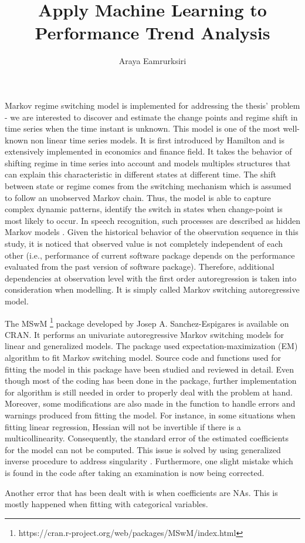 \documentclass[]{article}
\title{Apply Machine Learning to Performance Trend Analysis}
\author{Araya Eamrurksiri}
\begin{document}
\date{}
\maketitle

Markov regime switching model is implemented for addressing the thesis' problem - we are interested to discover and estimate the change points and regime shift in time series when the time instant is unknown. This model is one of the most well-known non linear time series models. It is first introduced by Hamilton \cite{hamilton1989new} and is extensively implemented in economics and finance field. It takes the behavior of shifting regime in time series into account and models multiples structures that can explain this characteristic in different states at different time. The shift between state or regime comes from the switching mechanism which is assumed to follow an unobserved Markov chain. Thus, the model is able to capture complex dynamic patterns, identify the switch in states when change-point is most likely to occur. In speech recognition, such processes are described as hidden Markov models \cite{rabiner1989tutorial}. Given the historical behavior of the observation sequence in this study, it is noticed that observed value is not completely independent of each other (i.e., performance of current software package depends on the performance evaluated from the past version of software package). Therefore, additional dependencies at observation level with the first order autoregression is taken into consideration when modelling. It is simply called Markov switching autoregressive model.

The MSwM \footnote{https://cran.r-project.org/web/packages/MSwM/index.html} package developed by Josep A. Sanchez-Espigares is available on CRAN. It performs an univariate autoregressive Markov switching models for linear and generalized models. The package used expectation-maximization (EM) algorithm to fit Markov switching model. Source code and functions used for fitting the model in this package have been studied and reviewed in detail. Even though most of the coding has been done in the package, further implementation for algorithm is still needed in order to properly deal with the problem at hand. Moreover, some modifications are also made in the function to handle errors and warnings produced from fitting the model. For instance, in some situations when fitting linear regression, Hessian will not be invertible if there is a multicollinearity. Consequently, the standard error of the estimated coefficients for the model can not be computed. This issue is solved by using generalized inverse procedure to address singularity \cite{gill2004your}. Furthermore, one slight mistake which is found in the code after taking an examination is now being corrected.

Another error that has been dealt with is when coefficients are NAs. This is mostly happened when fitting with categorical variables.



\end{document}

